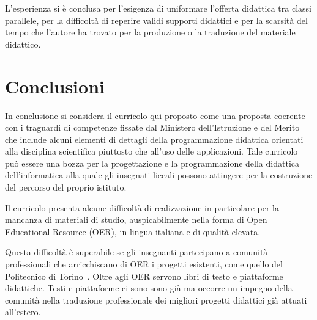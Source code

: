 \documentclass[a4paper]{easychair}
\begin{document}
L'esperienza si è conclusa per l'esigenza di uniformare l'offerta didattica tra classi parallele,
per la difficoltà di reperire validi supporti didattici e per la scarsità del tempo che l'autore
ha trovato per la produzione o la traduzione del materiale didattico.

\section{Conclusioni}
\label{sec:conclusioni}

In conclusione si considera il curricolo qui proposto come
una proposta coerente con i traguardi di competenze fissate dal  
Ministero dell'Istruzione e del Merito che include alcuni elementi
di dettagli della programmazione didattica
orientati alla disciplina scientifica piuttosto che all'uso delle applicazioni.
Tale curricolo può essere una bozza per la progettazione e la programmazione
della didattica dell'informatica %
alla quale gli insegnati liceali possono attingere per la costruzione del percorso
del proprio istituto.

Il curricolo presenta alcune difficoltà di realizzazione in particolare per
la mancanza di materiali di studio, auspicabilmente nella forma di Open Educational Resource (OER),
in lingua italiana e di qualità elevata.


Questa difficoltà è superabile se gli insegnanti partecipano a comunità professionali
che arricchiscano di OER i progetti esistenti, come quello del Politecnico di Torino~\cite{fare}.
Oltre agli OER servono libri di testo e piattaforme didattiche.
Testi e piattaforme ci sono sono già ma occorre un impegno della comunità nella traduzione
professionale dei migliori progetti didattici già attuati all'estero.

\label{sect:bib}
%
%
%
\printbibliography
\end{document}
